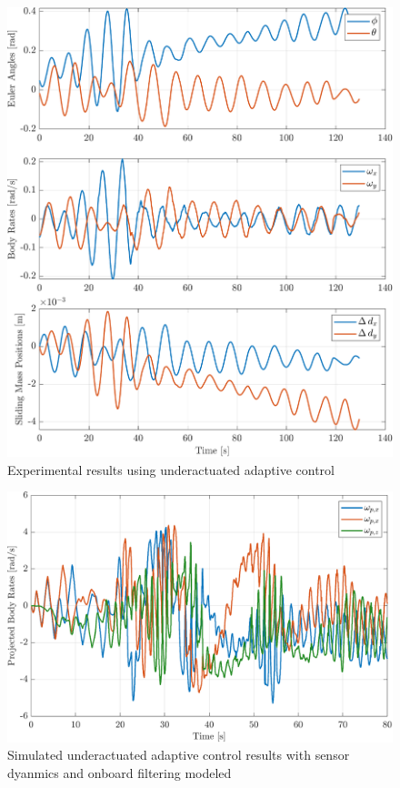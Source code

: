 \begin{figure}[p!]
    \centering
    \includegraphics[width=\linewidth]{plots/adaptive_hardware_failure.pdf}
    \caption{Experimental results using underactuated adaptive control}
    \label{fig:adaptive_hardware_failure}
\end{figure}

\begin{figure}[h]
    \centering
    \includegraphics[width=0.9\linewidth]{plots/adaptive_sim_failure.pdf}
    \caption{Simulated underactuated adaptive control results with sensor dyanmics and onboard filtering modeled}
\end{figure}

